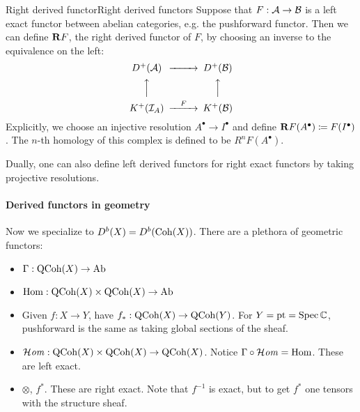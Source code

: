 
\begin{definition}{Right derived functor}{Right derived functors}
    Suppose that $F:\mathcal{A} \rightarrow \mathcal{B}$ is a left exact functor between abelian categories, e.g. the pushforward functor. Then we can define $\mathbf{R} F$, the right derived functor of $F$, by choosing an inverse to the equivalence on the left:
\begin{equation*}
    \begin{CD}
        D^+(\calA) @>>> D^+(\calB) \\
          @AAA @AAA \\
        K^+(\calI_A) @>F>> K^+(\calB)
    \end{CD}
\end{equation*}
Explicitly, we choose an injective resolution $A^\bullet\to I^\bullet$ and
define $\mathbf{R} F(A^\bullet)\coloneqq F(I^\bullet)$. The $n$-th homology of this complex is defined to be $R^nF(A^\bullet)$.
\end{definition}

Dually, one can also define left derived functors for right exact functors by taking projective resolutions. 

\paragraph{Derived functors in geometry}

Now we specialize to $D^b(X)=D^b(\operatorname{Coh}(X))$. There are a plethora of geometric functors:

\begin{itemize}
    \item $\Gamma:\operatorname{QCoh}(X)\to\mathrm{Ab}$
    \item $\operatorname{Hom}:\operatorname{QCoh}(X)\times\operatorname{QCoh}(X)\to\mathrm{Ab}$
    \item Given $f:X\to Y$, have $f_*:\operatorname{QCoh}(X)\to\operatorname{QCoh}(Y)$. For $Y=\mathrm{pt}=\operatorname{Spec}\mathbb{C}$, pushforward is the same as taking global sections of the sheaf.
    \item $\operatorname{\mathcal{H}\mathit{om}}:\operatorname{QCoh}(X)\times\operatorname{QCoh}(X)\to\operatorname{QCoh}(X)$. Notice $\Gamma\circ\operatorname{\mathcal{H}\mathit{om}}=\operatorname{Hom}$. These are left exact.
    \item $\otimes$, $f^*$. These are right exact. Note that $f^{-1}$ is exact, but to get $f^*$ one tensors with the structure sheaf.
\end{itemize}

